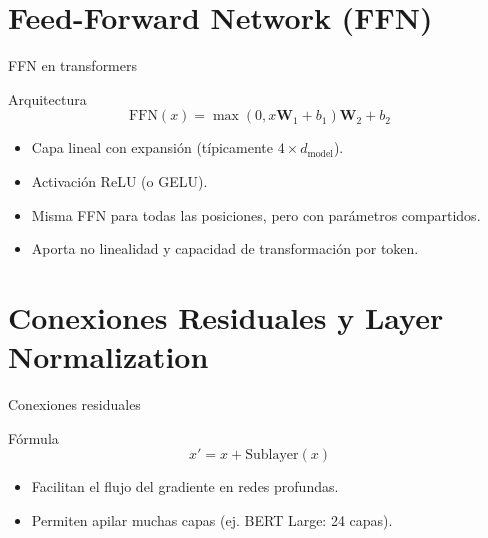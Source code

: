 \documentclass[aspectratio=169, 10pt, xcolor=table]{beamer}
\begin{document}
\section{Feed-Forward Network (FFN)}

\begin{frame}{FFN en transformers}
    \begin{block}{Arquitectura}
        \[
        \text{FFN}(x) = \max(0, x\mathbf{W}_1 + b_1)\mathbf{W}_2 + b_2
        \]
        \begin{itemize}
            \item Capa lineal con expansión (típicamente $4 \times d_{\text{model}}$).
            \item Activación ReLU (o GELU).
            \item Misma FFN para todas las posiciones, pero con parámetros compartidos.
        \end{itemize}
    \end{block}
    \begin{itemize}
        \item Aporta no linealidad y capacidad de transformación por token.
    \end{itemize}
\end{frame}

\section{Conexiones Residuales y Layer Normalization}

\begin{frame}{Conexiones residuales}
    \begin{block}{Fórmula}
        \[
        x' = x + \text{Sublayer}(x)
        \]
    \end{block}
    \begin{itemize}
        \item Facilitan el flujo del gradiente en redes profundas.
        \item Permiten apilar muchas capas (ej. BERT Large: 24 capas).
    \end{itemize}
\end{frame}
\end{document}
